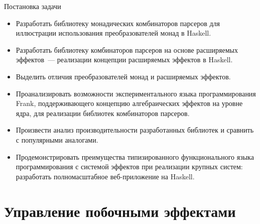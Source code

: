 \begin{frame}[fragile]{Постановка задачи}
\begin{itemize}
\item Разработать библиотеку монадических комбинаторов парсеров для
иллюстрации использования преобразователей монад в Haskell.
\item Разработать библиотеку комбинаторов парсеров на основе расширяемых эффектов~---
реализации концепции расширяемых эффектов в Haskell.
\item Выделить отличия преобразователей монад и расширяемых эффектов.
\item Проанализировать возможности экспериментального языка программирования Frank,
поддерживающего концепцию алгебраических эффектов на уровне ядра, для реализации
библиотек комбинаторов парсеров.
\item Произвести анализ производительности разработанных библиотек и сравнить с
популярными аналогами.
\item Продемонстрировать преимущества типизированного функционального языка программирования
с системой эффектов при реализации крупных систем: разработать полномасштабное
веб-приложение на Haskell.
\end{itemize}
\end{frame}

\section{Управление побочными эффектами}


